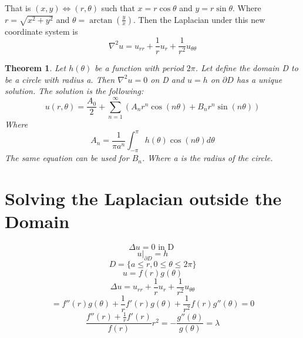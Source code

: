 \documentclass{article}
\newtheorem{theorem}{Theorem}[section]
\begin{document}
That is $(x,y) \iff (r, \theta)$ such that $x = r\cos\theta$ and $y = r\sin\theta$. Where $r = \sqrt{x^2 + y^2}$ and $\theta = \arctan(\frac{y}{x})$. Then the Laplacian under this new coordinate system is 
\begin{equation}
    \nabla^2u = u_{rr} + \frac{1}{r}u_r + \frac{1}{r^2}u_{\theta \theta}
\end{equation}

\begin{theorem}
    Let $h(\theta)$ be a function with period $2\pi$. Let define the domain D to be a circle with radius a. Then $\nabla^2u = 0$ on D and $u = h$ on $\partial D$ has a unique solution. The solution is the following:
    \begin{equation}
        u(r, \theta) = \frac{A_0}{2} + \sum_{n=1}^{\infty}(A_n r^n\cos(n\theta) + B_n r^n \sin(n\theta))
    \end{equation}
    Where 
    \begin{equation}
        A_n = \frac{1}{\pi a^n}\int_{-\pi}^{\pi}h(\theta)\cos(n\theta) d\theta
    \end{equation}
    The same equation can be used for $B_n$. Where a is the radius of the circle. 
\end{theorem}

\section*{Solving the Laplacian outside the Domain}

\begin{equation}
    \Delta u = 0 \textrm{ in D }
\end{equation}
\begin{equation}
    u|_{\partial D} = h
\end{equation}
\begin{equation}
    D = \{a \leq r, 0 \leq \theta \leq 2\pi\}
\end{equation}
\begin{equation}
    u = f(r)g(\theta)
\end{equation}
\begin{equation}
    \Delta u = u_{rr} + \frac{1}{r}u_r + \frac{1}{r^2}u_{\theta \theta}
\end{equation}
\begin{equation}
    = f''(r)g(\theta) + \frac{1}{r}f'(r)g(\theta) + \frac{1}{r^2}f(r)g''(\theta) = 0
\end{equation}
\begin{equation}
    \frac{f''(r) + \frac{1}{r}f'(r)}{f(r)}r^2 = -\frac{g''(\theta)}{g(\theta)} = \lambda
\end{equation}
\end{document}
